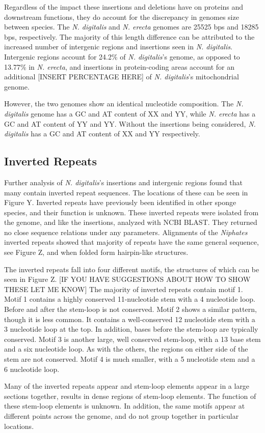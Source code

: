 \documentclass[../main.tex]{subfiles}
\begin{document}
Regardless of the impact these insertions and deletions have on proteins and downstream functions, they do account for the discrepancy in genomes size between species. The \emph{N. digitalis} and \emph{N. erecta} genomes are 25525 bps and 18285 bps, respectively. The majority of this length difference can be attributed to the increased number of intergenic regions and insertions seen in \emph{N. digitalis}. Intergenic regions account for 24.2\% of \emph{N. digitalis}'s genome, as opposed to 13.77\% in \emph{N. erecta}, and insertions in protein-coding areas account for an additional [INSERT PERCENTAGE HERE] of \emph{N. digitalis}'s mitochondrial genome.

However, the two genomes show an identical nucleotide composition.  The \emph{N. digitalis} genome has a GC and AT content of XX and YY, while \emph{N. erecta} has a GC and AT content of YY and YY. Without the insertions being considered, \emph{N. digitalis} has a GC and AT content of XX and YY respectively.  

\subsection{Inverted Repeats}

Further analysis of \emph{N. digitalis}'s insertions and intergenic regions found that many contain inverted repeat sequences. The locations of these can be seen in Figure Y. Inverted repeats have previously been identified in other sponge species, and their function is unknown. These inverted repeats were isolated from the genome, and like the insertions, analyzed with NCBI BLAST. They returned no close sequence relations under any parameters. Alignments of the \emph{Niphates} inverted repeats showed that majority of repeats have the same general sequence, see Figure Z, and when folded form hairpin-like structures.

The inverted repeats fall into four different motifs, the structures of which can be seen in Figure Z. [IF YOU HAVE SUGGESTIONS ABOUT HOW TO SHOW THESE LET ME KNOW] The majority of inverted repeats contain motif 1. Motif 1 contains a highly conserved 11-nucleotide stem with a 4 nucleotide loop. Before and after the stem-loop is not conserved. Motif 2 shows a similar pattern, though it is less common. It contains a well-conserved 12 nucleotide stem with a 3 nucleotide loop at the top. In addition, bases before the stem-loop are typically conserved. Motif 3 is another large, well conserved stem-loop, with a 13 base stem and a six nucleotide loop. As with the others, the regions on either side of the stem are not conserved. Motif 4 is much smaller, with a 5 nucleotide stem and a 6 nucleotide loop. 

Many of the inverted repeats appear and stem-loop elements appear in a large sections together, results in dense regions of stem-loop elements. The function of these stem-loop elements is unknown. In addition, the same motifs appear at different points across the genome, and do not group together in particular locations.
\end{document}
